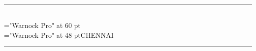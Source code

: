 \documentclass[a4paper,11pt,landscape]{article}
\begin{document}
\pagestyle{empty}
\begin{center}
\mbox{}\\[2.5in]
\hrule\mbox{}
\mbox{}\\[1ex]
\mbox{}
{\font\x="Warnock Pro" at 60 pt\\[0.5cm]}
\mbox{}
{\font\x="Warnock Pro" at 48 pt\x \uppercase{Chennai}\\[0.3cm]}
\hrule

\end{center}
\end{document}
